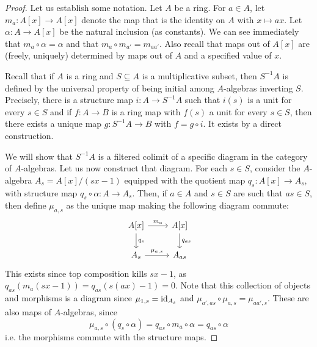 \documentclass[12pt]{exam}
\begin{document}
\begin{proof}
	Let us establish some notation. Let $A$ be a ring. For $a \in A$, let $m_a : A[x] \to A[x]$ denote the map that is the identity on $A$ with $x \mapsto ax$. Let $\alpha : A \to A[x]$ be the natural inclusion (as constants). We can see immediately that $m_a \circ \alpha = \alpha$ and that $m_a \circ m_{a'} = m_{aa'}$. Also recall that maps out of $A[x]$ are (freely, uniquely) determined by maps out of $A$ and a specified value of $x$.

	Recall that if $A$ is a ring and $S \subseteq A$ is a multiplicative subset, then $S^{-1}A$ is defined by the universal property of being initial among $A$-algebras inverting $S$. Precisely, there is a structure map $i : A \to S^{-1}A$ such that $i(s)$ is a unit for every $s \in S$ and if $f : A \to B$ is a ring map with $f(s)$ a unit for every $s \in S$, then there exists a unique map $g : S^{-1}A \to B$ with $f = g \circ i$. It exists by a direct construction.
	
	We will show that $S^{-1}A$ is a filtered colimit of a specific diagram in the category of $A$-algebras. Let us now construct that diagram. For each $s \in S$, consider the $A$-algebra $A_s = A[x]/(sx-1)$ equipped with the quotient map $q_s : A[x] \to A_s$, with structure map $q_s \circ \alpha : A \to A_s$. Then, if $a \in A$ and $s \in S$ are such that $as \in S$, then define $\mu_{a,s}$ as the unique map making the following diagram commute:
	\[ \begin{tikzcd} A[x] \arrow[d,"q_s"] \arrow[r,"m_a"] & A[x] \arrow[d,"q_{as}"] \\ A_s \arrow[r,"\mu_{a,s}"] & A_{as} \end{tikzcd} \]
	This exists since top composition kills $sx-1$, as $q_{as}(m_a(sx-1)) = q_{as}(s(ax)-1) = 0$. Note that this collection of objects and morphisms is a diagram since $\mu_{1,s} = \operatorname{id}_{A_s}$ and $\mu_{a',as} \circ \mu_{a,s} = \mu_{aa',s}$. These are also maps of $A$-algebras, since
	\[ \mu_{a,s} \circ (q_s \circ \alpha) = q_{as} \circ m_a \circ \alpha = q_{as} \circ \alpha \]
	i.e. the morphisms commute with the structure maps.
	

\end{proof}
\end{document}
